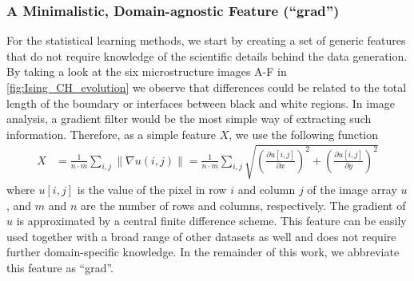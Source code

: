 \documentclass[11pt, authoryear]{elsarticle}
\begin{document}
	\subsubsection{A Minimalistic, Domain-agnostic Feature (``grad'')}
	\label{sec:gradfeature}
	For the statistical learning methods, we start by creating a set of generic 
	features that do not require knowledge of the scientific details behind the 
	data generation. By taking a look at the six microstructure images A-F in 
	\cref{fig:Ising_CH_evolution} we observe that differences could be related to 
	the total length of the boundary or interfaces between black and white regions. 
	In image analysis, a gradient filter would be the most simple way of extracting 
	such information. Therefore, as a simple feature $X$, we use the following 
	function
	\begin{align}
		X &= \frac{1}{n\cdot m}\sum\limits_{i,j} \|\nabla u(i, j)\|
		= \frac{1}{n\cdot m}\sum\limits_{i,j} 
		\sqrt{\left(\frac{\partial u[i,j]}{\partial x} \right)^2 + 
			\left(\frac{\partial u[i, j]}{\partial y} \right)^2}
	\end{align}
	where $u[i, j]$ is the value of the pixel in row $i$ and column $j$ of the 
	image array $u$, and $m$ and $n$ are the number of rows and columns, 
	respectively. The gradient of $u$ is approximated by a central finite 
	difference scheme. This feature can be easily used together with a broad range 
	of other datasets as well and does not require further domain-specific 
	knowledge. In the remainder of this work, we abbreviate this feature as 
	``grad''.
	
	
	
\end{document}
